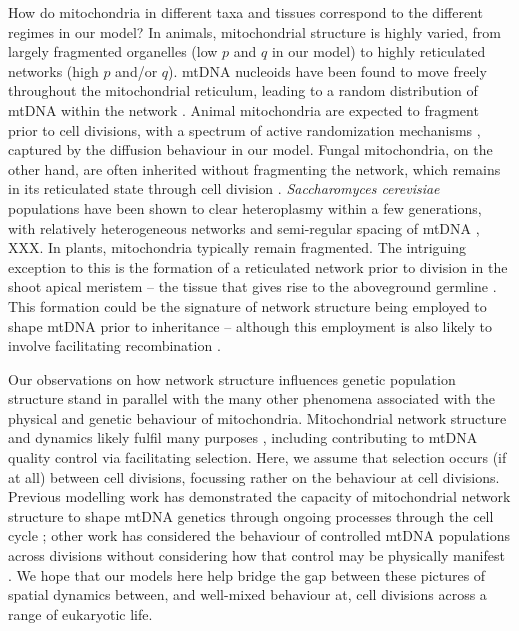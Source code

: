 \documentclass{article}
\begin{document}
How do mitochondria in different taxa and tissues correspond to the different regimes in our model? In animals, mitochondrial structure is highly varied, from largely fragmented organelles (low $p$ and $q$ in our model) to highly reticulated networks (high $p$ and/or $q$). mtDNA nucleoids have been found to move freely throughout the mitochondrial reticulum, leading to a random distribution of mtDNA within the network \citep{legros2004organization, sasaki2017live}. Animal mitochondria are expected to fragment prior to cell divisions, with a spectrum of active randomization mechanisms \citep{pangou2021multifaceted, moore2021actin}, captured by the diffusion behaviour in our model. Fungal mitochondria, on the other hand, are often inherited without fragmenting the network, which remains in its reticulated state through cell division \citep{mendoza2020mitochondrial}. \textit{Saccharomyces cerevisiae} populations have been shown to clear heteroplasmy within a few generations, with relatively heterogeneous networks and semi-regular spacing of mtDNA \citep{jakubke2021cristae}, XXX. In plants, mitochondria typically remain fragmented. The intriguing exception to this is the formation of a reticulated network prior to division in the shoot apical meristem -- the tissue that gives rise to the aboveground germline \cite{segui2009mitochondrial}. This formation could be the signature of network structure being employed to shape mtDNA prior to inheritance -- although this employment is also likely to involve facilitating recombination \cite{edwards2021avoiding}. 
 
 Our observations on how network structure influences genetic population structure stand in parallel with the many other phenomena associated with the physical and genetic behaviour of mitochondria. Mitochondrial network structure and dynamics likely fulfil many purposes \cite{hoitzing2015function}, including contributing to mtDNA quality control \citep{twig2008mitochondrial, twig2008fission} via facilitating selection. Here, we assume that selection occurs (if at all) between cell divisions, focussing rather on the behaviour at cell divisions. Previous modelling work has demonstrated the capacity of mitochondrial network structure to shape mtDNA genetics through ongoing processes through the cell cycle \cite{aryaman2019mitochondrial, edwards2021avoiding}; other work has considered the behaviour of controlled mtDNA populations across divisions without considering how that control may be physically manifest \cite{johnston2015closed, johnston2016evolution}. We hope that our models here help bridge the gap between these pictures of spatial dynamics between, and well-mixed behaviour at, cell divisions across a range of eukaryotic life.
 
\end{document}
